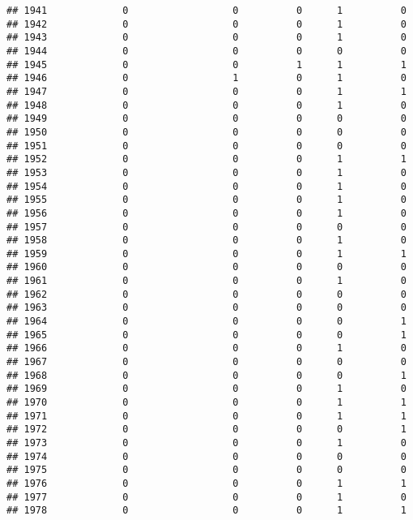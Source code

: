 \documentclass[
]{article}
\begin{document}
\begin{verbatim}
## 1941             0                  0          0      1          0
## 1942             0                  0          0      1          0
## 1943             0                  0          0      1          0
## 1944             0                  0          0      0          0
## 1945             0                  0          1      1          1
## 1946             0                  1          0      1          0
## 1947             0                  0          0      1          1
## 1948             0                  0          0      1          0
## 1949             0                  0          0      0          0
## 1950             0                  0          0      0          0
## 1951             0                  0          0      0          0
## 1952             0                  0          0      1          1
## 1953             0                  0          0      1          0
## 1954             0                  0          0      1          0
## 1955             0                  0          0      1          0
## 1956             0                  0          0      1          0
## 1957             0                  0          0      0          0
## 1958             0                  0          0      1          0
## 1959             0                  0          0      1          1
## 1960             0                  0          0      0          0
## 1961             0                  0          0      1          0
## 1962             0                  0          0      0          0
## 1963             0                  0          0      0          0
## 1964             0                  0          0      0          1
## 1965             0                  0          0      0          1
## 1966             0                  0          0      1          0
## 1967             0                  0          0      0          0
## 1968             0                  0          0      0          1
## 1969             0                  0          0      1          0
## 1970             0                  0          0      1          1
## 1971             0                  0          0      1          1
## 1972             0                  0          0      0          1
## 1973             0                  0          0      1          0
## 1974             0                  0          0      0          0
## 1975             0                  0          0      0          0
## 1976             0                  0          0      1          1
## 1977             0                  0          0      1          0
## 1978             0                  0          0      1          1

\end{verbatim}
\end{document}
